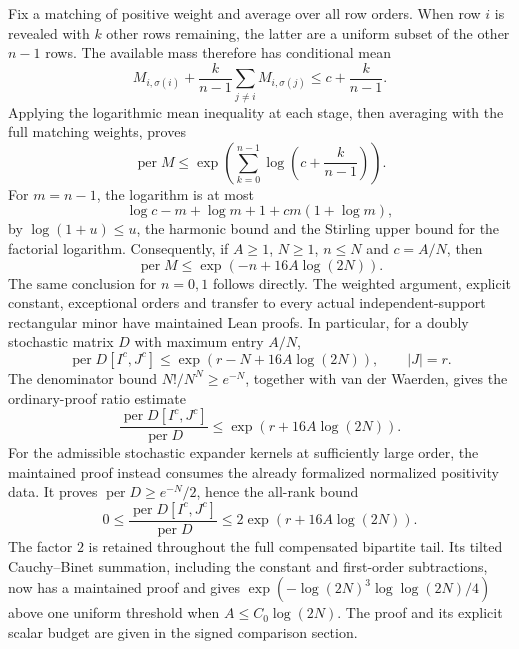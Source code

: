 Fix a matching of positive weight and average over all row orders.
When row \(i\) is revealed with \(k\) other rows remaining,
the latter are a uniform subset of the other \(n-1\) rows.
The available mass therefore has conditional mean
\[
 M_{i,\sigma(i)}
       +\frac{k}{n-1}\sum_{j\ne i}M_{i,\sigma(j)}
                         \leq c+\frac{k}{n-1}.
\]
Applying the logarithmic mean inequality at each stage, then
averaging with the full matching weights, proves
\[
 \operatorname{per}M\leq
 \exp\!\left(\sum_{k=0}^{n-1}\log\left(c+\frac{k}{n-1}\right)\right).
\]
For \(m=n-1\), the logarithm is at most
\[
 \log c-m+\log m+1+cm(1+\log m),
\]
by \(\log(1+u)\leq u\), the harmonic bound and the Stirling
upper bound for the factorial logarithm.
Consequently, if \(A\geq1\), \(N\geq1\), \(n\leq N\) and
\(c=A/N\), then
\[
 \operatorname{per}M\leq \exp(-n+16A\log(2N)).
\]
The same conclusion for \(n=0,1\) follows directly.
The weighted argument, explicit constant, exceptional orders and
transfer to every actual independent-support rectangular minor
have maintained Lean proofs. In particular, for a doubly stochastic
matrix \(D\) with maximum entry \(A/N\),
\[
 \operatorname{per}D[I^c,J^c]
                       \leq \exp(r-N+16A\log(2N)),\qquad |J|=r.
\]
The denominator bound \(N!/N^N\geq e^{-N}\), together with
van der Waerden, gives the ordinary-proof ratio estimate
\[
 \frac{\operatorname{per}D[I^c,J^c]}{\operatorname{per}D}
                       \leq\exp(r+16A\log(2N)).
\]
For the admissible stochastic expander kernels at sufficiently large
order, the maintained proof instead consumes the already formalized
normalized positivity data.  It proves
\(\operatorname{per}D\geq e^{-N}/2\), hence the all-rank bound
\[
 0\leq\frac{\operatorname{per}D[I^c,J^c]}{\operatorname{per}D}
                       \leq2\exp(r+16A\log(2N)).
\]
The factor \(2\) is retained throughout the full compensated bipartite
tail.  Its tilted Cauchy--Binet summation, including the constant and
first-order subtractions, now has a maintained proof and gives
\(\exp(-\log(2N)^3\log\log(2N)/4)\) above one uniform threshold
when \(A\leq C_0\log(2N)\).  The proof and its explicit scalar budget
are given in the signed comparison section.

